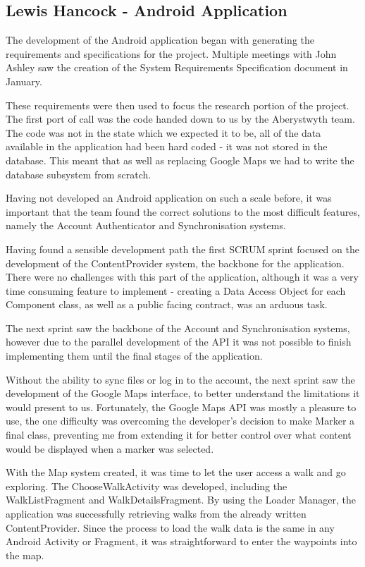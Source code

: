 \documentclass[11pt,a4paper]{report}
\begin{document}
\subsection{Lewis Hancock - Android Application}
The development of the Android application began with generating the requirements and specifications for the project. Multiple meetings with John Ashley saw the creation of the System Requirements Specification document in January. 

These requirements were then used to focus the research portion of the project. The first port of call was the code handed down to us by the Aberystwyth team. The code was not in the state which we expected it to be, all of the data available in the application had been hard coded - it was not stored in the database. This meant that as well as replacing Google Maps we had to write the database subsystem from scratch.

Having not developed an Android application on such a scale before, it was important that the team found the correct solutions to the most difficult features, namely the Account Authenticator and Synchronisation systems. 

Having found a sensible development path the first SCRUM sprint focused on the development of the ContentProvider system, the backbone for the application. There were no challenges with this part of the application, although it was a very time consuming feature to implement - creating a Data Access Object for each Component class, as well as a public facing contract, was an arduous task.

The next sprint saw the backbone of the Account and Synchronisation systems, however due to the parallel development of the API it was not possible to finish implementing them until the final stages of the application.

Without the ability to sync files or log in to the account, the next sprint saw the development of the Google Maps interface, to better understand the limitations it would present to us. Fortunately, the Google Maps API was mostly a pleasure to use, the one difficulty was overcoming the developer's decision to make Marker a final class, preventing me from extending it for better control over what content would be displayed when a marker was selected.

With the Map system created, it was time to let the user access a walk and go exploring. The ChooseWalkActivity was developed, including the WalkListFragment and WalkDetailsFragment. By using the Loader Manager, the application was successfully retrieving walks from the already written ContentProvider. Since the process to load the walk data is the same in any Android Activity or Fragment, it was straightforward to enter the waypoints into the map. 
\end{document}
